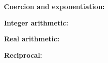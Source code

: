 \begin{figure}
  \centering
  \begin{mdframed}
    \footnotesize
    \centering

    \textbf{Coercion and exponentiation:}
    \begin{mathpar}


    \end{mathpar}
    
    \medskip

    \textbf{Integer arithmetic:}
    \begin{mathpar}
    \end{mathpar}

\medskip

    \textbf{Real arithmetic:}
    \begin{mathpar}
    \end{mathpar}

\medskip

    \textbf{Reciprocal:}
    \begin{mathpar}


\end{mathpar}
\end{mdframed}
\end{figure}
